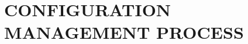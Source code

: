 \documentclass[11pt, twoside, a4paper]{book}
\begin{document}
        \chapter{CONFIGURATION MANAGEMENT PROCESS}

    
    
\end{document}
